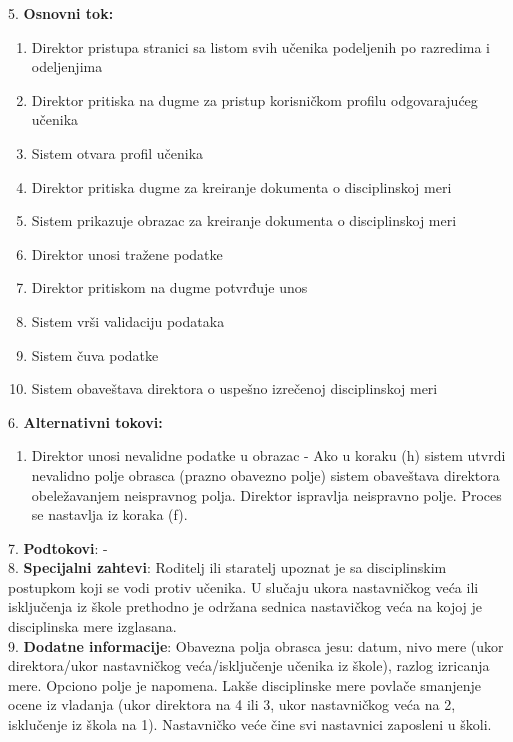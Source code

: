 \documentclass{article}
\begin{document}
5. \textbf{Osnovni tok:} 
\begin{enumerate} [label=(\alph*)]
\item Direktor pristupa stranici sa listom svih učenika podeljenih po razredima i odeljenjima 
\item Direktor pritiska na dugme za pristup korisničkom profilu odgovarajućeg učenika
\item Sistem otvara profil učenika
\item Direktor pritiska dugme za kreiranje dokumenta o disciplinskoj meri
\item Sistem prikazuje obrazac za kreiranje dokumenta o disciplinskoj meri 
\item Direktor unosi tražene podatke
\item Direktor pritiskom na dugme potvrđuje unos
\item Sistem vrši validaciju podataka
\item Sistem čuva podatke
\item Sistem obaveštava direktora o uspešno izrečenoj disciplinskoj meri
\end{enumerate}

6. \textbf{Alternativni tokovi:}
\begin{enumerate} [label=(\roman*)]
\item Direktor unosi nevalidne podatke u obrazac - Ako u koraku (h) sistem utvrdi nevalidno polje obrasca (prazno obavezno polje) sistem obaveštava direktora obeležavanjem neispravnog polja. Direktor ispravlja neispravno polje. Proces se nastavlja iz koraka (f).
\end{enumerate}

7. \textbf{Podtokovi}: - \\

8. \textbf{Specijalni zahtevi}: Roditelj ili staratelj upoznat je sa disciplinskim postupkom koji se vodi protiv učenika. U slučaju ukora nastavničkog veća ili isključenja iz škole prethodno je održana sednica nastavičkog veća na kojoj je disciplinska mere izglasana. \\

9. \textbf{Dodatne informacije}: Obavezna polja obrasca jesu: datum, nivo mere (ukor direktora/ukor nastavničkog veća/isključenje učenika iz škole), razlog izricanja mere. Opciono polje je napomena. Lakše disciplinske mere povlače smanjenje ocene iz vladanja (ukor direktora na 4 ili 3, ukor nastavničkog veća na 2, isklučenje iz škola na 1). Nastavničko veće čine svi nastavnici zaposleni u školi. \\
\end{document}
